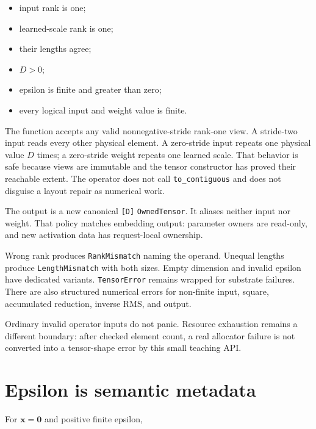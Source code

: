 \begin{itemize}
\tightlist
\item
  input rank is one;
\item
  learned-scale rank is one;
\item
  their lengths agree;
\item
  \(D>0\);
\item
  epsilon is finite and greater than zero;
\item
  every logical input and weight value is finite.
\end{itemize}

The function accepts any valid nonnegative-stride rank-one view. A
stride-two input reads every other physical element. A zero-stride input
repeats one physical value \(D\) times; a zero-stride weight repeats one
learned scale. That behavior is safe because views are immutable and the
tensor constructor has proved their reachable extent. The operator does
not call \texttt{to\_contiguous} and does not disguise a layout repair
as numerical work.

The output is a new canonical \texttt{{[}D{]}} \texttt{OwnedTensor}. It
aliases neither input nor weight. That policy matches embedding output:
parameter owners are read-only, and new activation data has
request-local ownership.

Wrong rank produces \texttt{RankMismatch} naming the operand. Unequal
lengths produce \texttt{LengthMismatch} with both sizes. Empty dimension
and invalid epsilon have dedicated variants. \texttt{TensorError}
remains wrapped for substrate failures. There are also structured
numerical errors for non-finite input, square, accumulated reduction,
inverse RMS, and output.

Ordinary invalid operator inputs do not panic. Resource exhaustion
remains a different boundary: after checked element count, a real
allocator failure is not converted into a tensor-shape error by this
small teaching API.

\section{Epsilon is semantic
metadata}\label{epsilon-is-semantic-metadata}


For \(\mathbf{x}=\mathbf{0}\) and positive finite epsilon,

